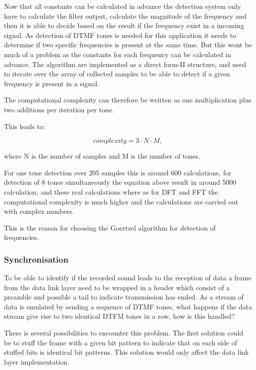 		Now that all constants can be calculated in advance the detection system only have to calculate the filter output, calculate
		the magnitude of the frequency and then it is able to decide based on the result if the frequency exist in a incoming signal.
		As detection of DTMF tones is needed for this application it needs to determine if two specific frequencies is present at the
		same time. But this wont be much of a problem as the constants for each frequency can be calculated in advance.
		The algorithm are implemented as a direct form-II structure, and need to iterate over the array of collected samples to be
		able to detect if a given frequency is present in a signal.
		
		The computational complexity can therefore be written as one multiplication plus two additions per iteration per tone.

		This leads to:
		\begin{center}\begin{equation}complexity = 3\cdot N\cdot M,\end{equation}\end{center}
		where N is the number of samples and M is the number of tones.
		
		For one tone detection over 205 samples this is around 600 calculations, for detection of 8 tones simultaneously the equation
		above result in around 5000 calculation, and these real calculations where as for DFT and FFT the computational complexity 
		is much higher and the calculations are carried out with complex numbers.
		
		This is the reason for choosing the Goertzel algorithm for detection of frequencies.
		
		\subsubsection{Synchronisation}
		To be able to identify if the recorded sound leads to the reception of data a frame from the data link
		layer need to be wrapped in a header which consist of a preamble and possible a tail to indicate transmission has ended.
		As a stream of data is emulated by sending a sequence of DTMF tones, what happens if the data stream give rise to two identical
		DTFM tones in a row, how is this handled? 
		
		There is several possibilities to encounter this problem. The first solution could be to stuff the frame with a given bit
		pattern to indicate that on each side of stuffed bits is identical bit patterns. This solution would only affect the data 
		link layer implementation.
		
